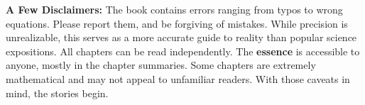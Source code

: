 \textbf{A Few Disclaimers:} The book contains errors ranging from typos to wrong equations. Please report them, and be forgiving of mistakes. While precision is unrealizable, this serves as a more accurate guide to reality than popular science expositions. All chapters can be read independently. The \textbf{essence} is accessible to anyone, mostly in the chapter summaries. Some chapters are extremely mathematical and may not appeal to unfamiliar readers. With those caveats in mind, the stories begin.

